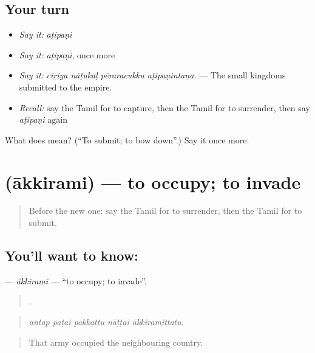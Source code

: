 \subsection*{Your turn}
\begin{itemize}
\raggedright
  \item \emph{Say it:} \emph{aṭipaṇi}
  \item \emph{Say it:} \emph{aṭipaṇi}, once more
  \item \emph{Say it:} \emph{ciṟiya nāṭukaḷ pēraracukku aṭipaṇintaṉa.} — The small kingdoms submitted to the empire.
  \item \emph{Recall:} say the Tamil for to capture, then the Tamil for to surrender, then say \emph{aṭipaṇi} again
\end{itemize}

\begin{tcolorbox}[breakable,colback=teal!4,colframe=teal!35!black,title={Before you move on}]
What does  mean? (\textquotedblleft{}To submit; to bow down\textquotedblright{}.) Say it once more.
\end{tcolorbox}
\section[\texorpdfstring{\ta{ஆக்கிரமி} (ākkirami)}{ஆக்கிரமி (ākkirami)}]{ (ākkirami) — to occupy; to invade}

\label{lesson:TA-C336-akkirami}



\begin{quote}
Before the new one: say the Tamil for to surrender, then the Tamil for to submit.
\end{quote}

\subsection*{You'll want to know: }
\textbf{} — \emph{ākkirami} — \textquotedblleft{}to occupy; to invade\textquotedblright{}.

\begin{quote}
    .
\end{quote}

\begin{quote}
\emph{antap paṭai pakkattu nāṭṭai ākkiramittatu.}
\end{quote}

\begin{quote}
That army occupied the neighbouring country.
\end{quote}

